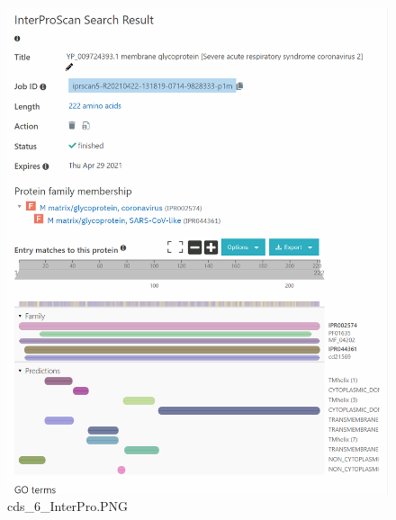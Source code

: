 \documentclass[supercite]{HustGraduPaper}
\begin{document}
	\begin{figure}[H]
		\centering
		\includegraphics[width=1\textwidth]{./material/practice2/cds_6/InterPro.png}
		\caption{cds\_6\_InterPro.PNG}
	\end{figure}
\clearpage
\end{document}
